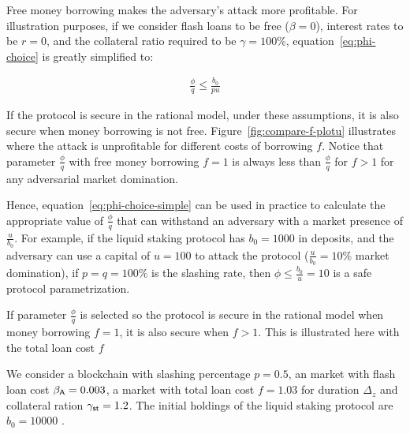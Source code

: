 Free money borrowing makes the adversary's attack more profitable.
For illustration purposes, if we consider flash loans to be free ($\beta = 0$), interest rates to be $r = 0$,
and the collateral ratio required to be $\gamma = 100\%$, equation~\eqref{eq:phi-choice} is greatly simplified to:

\begin{gather*}
  \frac{\phi}{q} \leq \frac{b_0}{pu} \label{eq:phi-choice-simple} \tag{$\ast$}
\end{gather*}

If the protocol is secure in the rational model, under these assumptions,
it is also secure when money borrowing is not free.
Figure~\ref{fig:compare-f-plotu} illustrates where the attack is unprofitable
for different costs of borrowing $f$. Notice that parameter $\frac{\phi}{q}$
with free money borrowing $f = 1$ is always less than $\frac{\phi}{q}$ for $f>1$
for any adversarial market domination.

Hence, equation~\eqref{eq:phi-choice-simple} can be used in practice
to calculate the appropriate value of $\frac{\phi}{q}$
that can withstand an adversary with a market presence of $\frac{u}{b_0}$.
For example, if the liquid staking protocol has $b_0 = 1000$ \asset in deposits,
and the adversary can use a capital of $u = 100$ \asset to attack the protocol
($\frac{u}{b_0} = 10\%$ market domination),
if $p = q = 100\%$ is the slashing rate, then $\phi \leq \frac{b_0}{u} = 10$
is a safe protocol parametrization.

If parameter $\frac{\phi}{q}$ is selected so the protocol is secure
in the rational model when money borrowing $f = 1$, it is also secure when $f > 1$.
This is illustrated here with the total loan cost $f$

We consider a blockchain with slashing percentage $p = 0.5$, an \asset market
with flash loan cost $\beta_{\textsf{A}} = 0.003$, a \stasset market with total
loan cost $f = 1.03$ for duration $\Delta_z$ and collateral ration
$\gamma_{\textsf{st}} = 1.2$. The initial \asset holdings of the liquid staking protocol
are $b_0 = 10000$ \asset.

